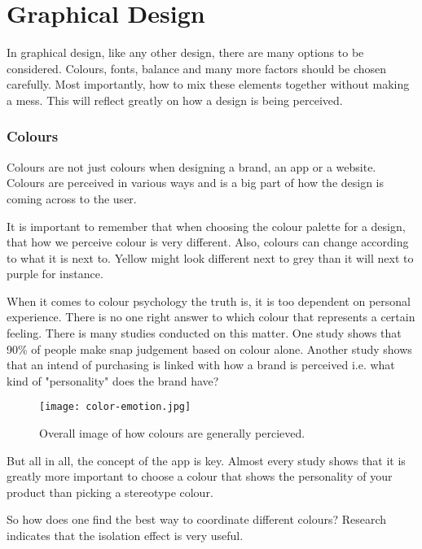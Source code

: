 \section{Graphical Design}\label{GraphicalDesign}
In graphical design, like any other design, there are many options to be considered. Colours, fonts, balance and many more factors should be chosen carefully. Most importantly, how to mix these elements together without making a mess. 
This will reflect greatly on how a design is being perceived. \cite{ColorMeaning}

\subsubsection{Colours}\label{Colours}

Colours are not just colours when designing a brand, an app or a website. Colours are perceived in various ways and is a big part of how the design is coming  across to the user. \cite{ColorMeaning}

It is important to remember that when choosing the colour palette for a design, that how we perceive colour is very different. Also, colours can change according to what it is next to. Yellow might look different next to grey than it will next to purple for instance. \cite{Colour}

When it comes to colour psychology the truth is, it is too dependent on personal experience. There is no one right answer to which colour that represents a certain feeling. \cite{ColorMeaning}
There is many studies conducted on this matter. 
One study shows that 90\% of people make snap judgement based on colour alone. \cite{ColorMeaning} Another study shows that an intend of purchasing is linked with how a brand is perceived i.e. what kind of "personality" does the brand have?\cite{ColorMeaning}

\begin{figure}[H]
\centering
\texttt{[image: color-emotion.jpg]}
\caption{Overall image of how colours are generally percieved. \cite{ColorMeaning}}
\end{figure}

But all in all, the concept of the app is key. Almost every study shows that it is greatly more important to choose a colour that shows the personality of your product than picking a stereotype colour. \cite{ColorMeaning}

So how does one find the best way to coordinate different colours? Research indicates that the isolation effect is very useful.

